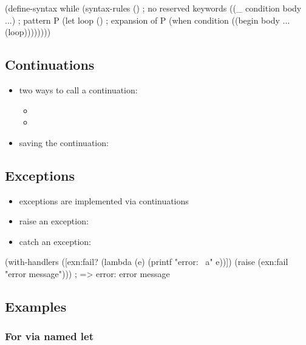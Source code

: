 \documentclass[a4paper,landscape,10pt]{article}
\begin{document}
\begin{multicols*}{2}
  \begin{racket}
(define-syntax while
  (syntax-rules ()          ; no reserved keywords
    ((_ condition body ...) ; pattern P
      (let loop ()          ; expansion of P
        (when condition
          ((begin body ...
            (loop))))))))
  \end{racket}

  \subsection{Continuations}

  \begin{itemize}
    \item two ways to call a continuation:
          \begin{itemize}
            \item {}
            \item {}
          \end{itemize}
    \item saving the continuation: 
  \end{itemize}

  \subsection{Exceptions}

  \begin{itemize}
    \item exceptions are implemented via continuations
    \item raise an exception: 
    \item catch an exception: 
  \end{itemize}

  \begin{racket}
(with-handlers
  ([exn:fail?
    (lambda (e) (printf "error: ~a\n" e))])
  (raise (exn:fail "error message")))
; => error: error message
  \end{racket}

  \breakcolumn

  \subsection{Examples}

  \subsubsection{For via named let}


\end{multicols*}
\end{document}
